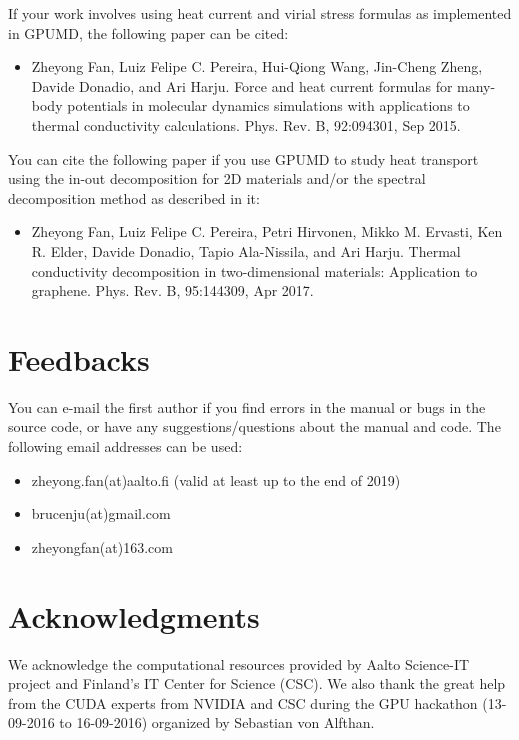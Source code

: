 \documentclass[12pt,a4paper]{report}
\begin{document}
If your work involves using heat current and virial stress formulas as implemented in GPUMD, the following paper can be cited:
\begin{itemize}
\item Zheyong Fan, Luiz Felipe C. Pereira, Hui-Qiong Wang, Jin-Cheng Zheng, Davide Donadio, and Ari Harju. Force and heat current formulas for many-body
potentials in molecular dynamics simulations with applications to thermal conductivity calculations. Phys. Rev. B, 92:094301, Sep 2015.
\end{itemize}

You can cite the following paper if you use GPUMD to study heat transport using the in-out decomposition for 2D materials and/or the spectral decomposition method as described in it:
\begin{itemize}
\item Zheyong Fan, Luiz Felipe C. Pereira, Petri Hirvonen, Mikko M. Ervasti, Ken R.
Elder, Davide Donadio, Tapio Ala-Nissila, and Ari Harju. Thermal conductivity
decomposition in two-dimensional materials: Application to graphene. Phys.
Rev. B, 95:144309, Apr 2017.
\end{itemize}

\section{Feedbacks}

You can e-mail the first author if you find errors in the manual or bugs in the source code, or have any suggestions/questions about the manual and code. The following email addresses can be used:
\begin{itemize}
\item zheyong.fan(at)aalto.fi (valid at least up to the end of 2019)
\item brucenju(at)gmail.com
\item zheyongfan(at)163.com
\end{itemize}


\section{Acknowledgments}
We acknowledge the computational resources provided by Aalto Science-IT project and Finland's IT Center for Science (CSC). We also thank the great help from the CUDA experts from NVIDIA and CSC during the GPU hackathon (13-09-2016 to 16-09-2016) organized by Sebastian von Alfthan.
\end{document}
